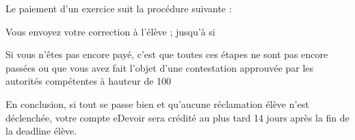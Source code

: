 ﻿Le paiement d’un exercice suit la procédure suivante :

\begin{itemize}
	\li Vous envoyez votre correction à l’élève ;
	\li jusqu’à %
	\li si %
\end{itemize}

Si vous n’êtes pas encore payé, c’est que toutes ces étapes ne sont pas encore passées ou que vous avez fait l’objet d’une contestation approuvée par les autorités compétentes à hauteur de 100%

En conclusion, si tout se passe bien et qu’aucune réclamation élève n’est déclenchée, votre compte eDevoir sera crédité au plus tard 14 jours après la fin de la deadline élève.